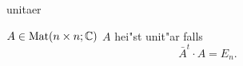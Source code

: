\documentclass[class=article, crop=false]{standalone}
\begin{document}
\begin{zettel}{unitaer}
\begin{flashcard}[]{}
	$ A \in  \operatorname{Mat}(n \times n; \mathbb{C} )$
	$A$ hei"st unit"ar falls
	\[
		\bar{A}^t \cdot  A = E_n
	.\]
\end{flashcard}
\end{zettel}
\end{document}
